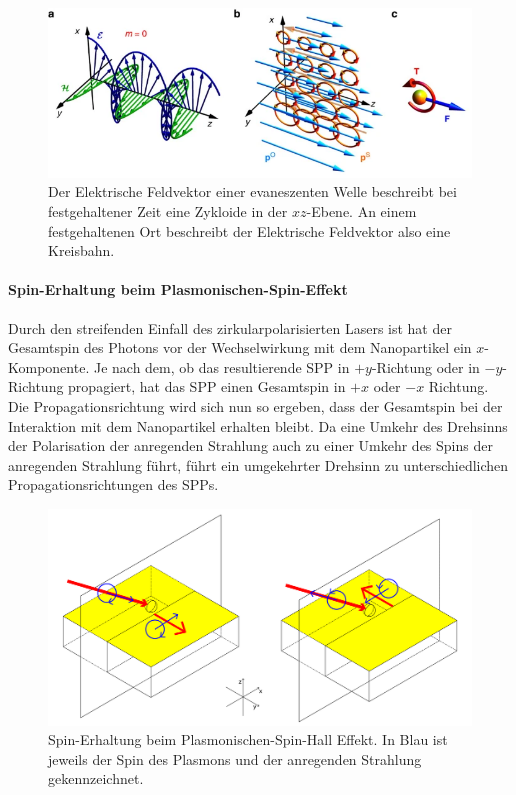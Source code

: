 \documentclass[titlepage]{article}
\begin{document}
		
	\begin{figure}[h]
		\centering
		\includegraphics[width=0.7\linewidth]{figures/spin/ev_spin}
		\caption{Der Elektrische Feldvektor einer evaneszenten Welle beschreibt bei festgehaltener Zeit eine Zykloide in der $xz$-Ebene. An einem festgehaltenen Ort beschreibt der Elektrische Feldvektor also eine Kreisbahn.}
		\label{fig:ev_spin}
	\end{figure}
	\paragraph{Spin-Erhaltung beim Plasmonischen-Spin-Effekt}
		Durch den streifenden Einfall des zirkularpolarisierten Lasers ist hat der Gesamtspin des Photons vor der Wechselwirkung mit dem Nanopartikel ein $x$-Komponente. Je nach dem, ob das resultierende SPP in $+y$-Richtung oder in $-y$-Richtung propagiert, hat das SPP einen Gesamtspin in  $+x$ oder $-x$ Richtung. Die Propagationsrichtung wird sich nun so ergeben, dass der Gesamtspin bei der Interaktion mit dem Nanopartikel erhalten bleibt. Da eine Umkehr des Drehsinns der Polarisation der anregenden Strahlung auch zu einer Umkehr des Spins der anregenden Strahlung führt, führt ein umgekehrter Drehsinn zu unterschiedlichen Propagationsrichtungen des SPPs.
		\begin{figure}[h]
			\centering
			\includegraphics[width=1.0\linewidth]{figures/spin_hall_schema.pdf}
			\caption{Spin-Erhaltung beim Plasmonischen-Spin-Hall Effekt. In Blau ist jeweils der Spin des Plasmons und der anregenden Strahlung gekennzeichnet.}
			\label{fig:spin_hall_schema}
		\end{figure}
\end{document}
